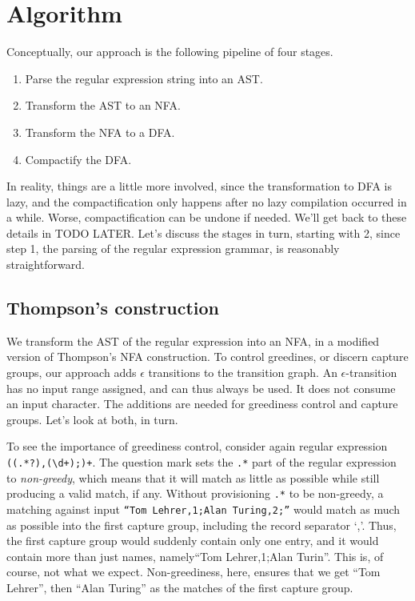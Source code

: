 \documentclass[english]{sigplanconf}
\begin{document}
\section{Algorithm}

Conceptually, our approach is the following pipeline of four stages.
\begin{enumerate}
  \item Parse the regular expression string into an AST.
  \item Transform the AST to an NFA.
  \item Transform the NFA to a DFA.
  \item Compactify the DFA.
\end{enumerate}

In reality, things are a little more involved, since the transformation
to DFA is lazy, and the compactification only happens after no lazy
compilation occurred in a while. Worse, compactification can be
undone if needed. We'll get back to these details in TODO LATER.
Let's discuss the stages in turn, starting with 2, since step 1,
the parsing of the regular expression grammar, is reasonably
straightforward.


\subsection{Thompson's construction} 

We transform the AST of the regular expression into an NFA,
in a modified version of Thompson's NFA construction. To
control greedines, or discern capture groups, our approach adds
$\epsilon$ transitions to the transition graph. An
$\epsilon$-transition has no input range assigned, and can thus always
be used. It does not consume an input character.
The additions are needed for greediness control and capture groups.
Let's look at both, in turn.

To see the importance of greediness control, consider again regular
expression \texttt{((.*?),(\textbackslash{}d+);)+}. The question
mark sets the \texttt{.*} part of the regular expression to
\emph{non-greedy}, which means that it will match as little as
possible while still producing a valid match, if any.  Without
provisioning \texttt{.*} to be non-greedy, a matching against input
\texttt{``Tom Lehrer,1;Alan Turing,2;''} would match as much as
possible into the first capture group, including the record separator
`,'.  Thus, the first capture group would suddenly contain only one
entry, and it would contain more than just names, namely``Tom
Lehrer,1;Alan Turin''.  This is, of course, not what we expect.
Non-greediness, here, ensures that we get ``Tom Lehrer'', then
``Alan Turing'' as the matches of the first capture group.
\end{document}
